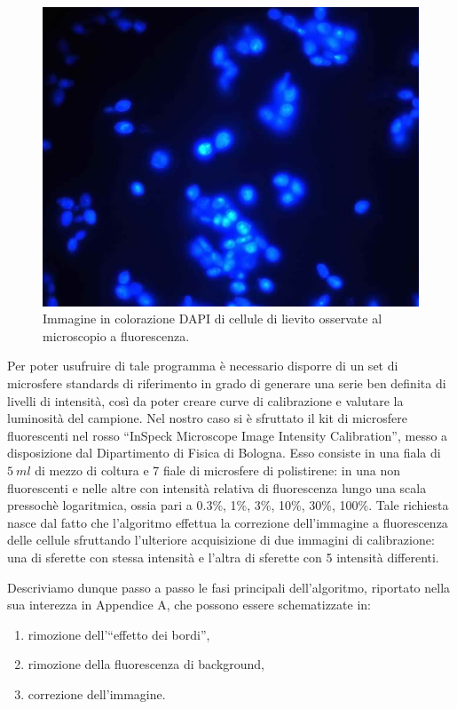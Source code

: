 \begin{figure}
 \centering
 \includegraphics[scale=.50]{img/CAP3bordi.jpg}
 \caption{\small{Immagine in colorazione DAPI di cellule di lievito osservate al microscopio a fluorescenza.}}
 \label{fig:bordi}
\end{figure}

Per poter usufruire di tale programma è necessario disporre di un set di microsfere standards di riferimento in grado di generare una serie ben definita di livelli di intensità, così da poter creare curve di calibrazione e valutare la luminosità del campione. 
Nel nostro caso si è sfruttato il kit di microsfere fluorescenti nel rosso ``InSpeck Microscope Image Intensity Calibration'', messo a disposizione dal Dipartimento di Fisica di Bologna. 
Esso consiste in una fiala di $5\ ml$ di mezzo di coltura e 7 fiale di microsfere di polistirene: in una non fluorescenti e nelle altre con intensità relativa di fluorescenza lungo una scala pressochè logaritmica, ossia pari a 0.3\%, 1\%, 3\%, 10\%, 30\%, 100\%.
Tale richiesta nasce dal fatto che l'algoritmo effettua la correzione dell'immagine a fluorescenza delle cellule sfruttando l'ulteriore acquisizione di due immagini di calibrazione: una di sferette con stessa intensità e l'altra di sferette con 5 intensità differenti.

Descriviamo dunque passo a passo le fasi principali dell'algoritmo, riportato nella sua interezza in Appendice A, che possono essere schematizzate in:
\begin{enumerate}
 \item rimozione dell'``effetto dei bordi'',
 \item rimozione della fluorescenza di background,
 \item correzione dell'immagine.
\end{enumerate}


